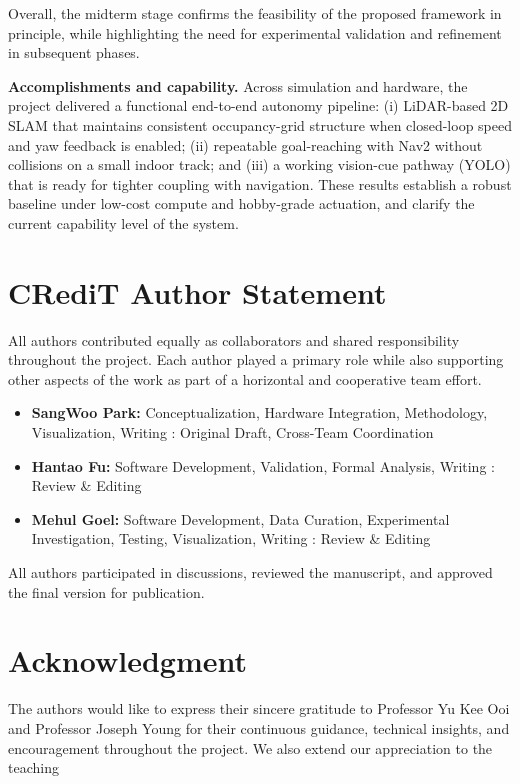 \documentclass[journal,transmag]{IEEEtran}
\begin{document}
Overall, the midterm stage confirms the feasibility of the proposed framework in principle, 
while highlighting the need for experimental validation and refinement in subsequent phases.


\noindent\textbf{Accomplishments and capability.} Across simulation and hardware, the project delivered a functional end-to-end autonomy pipeline:
(i) LiDAR-based 2D SLAM that maintains consistent occupancy-grid structure when closed-loop speed and yaw feedback is enabled;
(ii) repeatable goal-reaching with Nav2 without collisions on a small indoor track; and
(iii) a working vision-cue pathway (YOLO) that is ready for tighter coupling with navigation.
These results establish a robust baseline under low-cost compute and hobby-grade actuation, and clarify the current capability level of the system.

\section*{CRediT Author Statement}
\small
All authors contributed equally as collaborators and shared responsibility throughout the project.  
Each author played a primary role while also supporting other aspects of the work as part of a horizontal and cooperative team effort.

\begin{itemize}
    \item \textbf{SangWoo Park:} Conceptualization, Hardware Integration, Methodology, Visualization, Writing : Original Draft, Cross-Team Coordination  
    \item \textbf{Hantao Fu:} Software Development, Validation, Formal Analysis, Writing : Review \& Editing  
    \item \textbf{Mehul Goel:} Software Development, Data Curation, Experimental Investigation, Testing, Visualization, Writing : Review \& Editing  
\end{itemize}

All authors participated in discussions, reviewed the manuscript, and approved the final version for publication.

\normalsize

\section*{Acknowledgment}
\small
The authors would like to express their sincere gratitude to Professor Yu Kee Ooi and Professor Joseph Young for their continuous guidance, technical insights, and encouragement throughout the project.  
We also extend our appreciation to the teaching
\end{document}
